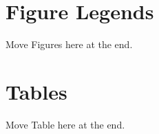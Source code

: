\documentclass[10pt]{article}
\begin{document}
\section*{Figure Legends}

Move Figures here at the end.

\section*{Tables}

Move Table here at the end.

\end{document}
